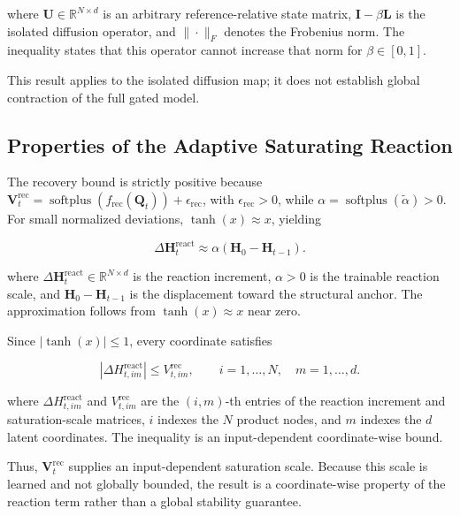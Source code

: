 \documentclass[letterpaper]{article} %
\begin{document}
where \(\mathbf U\in\mathbb R^{N\times d}\) is an arbitrary reference-relative state matrix, \(\mathbf I-\beta\mathbf L\) is the isolated diffusion operator, and \(\|\cdot\|_F\) denotes the Frobenius norm. The inequality states that this operator cannot increase that norm for \(\beta\in[0,1]\).

This result applies to the isolated diffusion map; it does not establish global contraction of the full gated model.

\subsection{Properties of the Adaptive Saturating Reaction}
\label{app:reaction-properties}

The recovery bound is strictly positive because \(\mathbf V_t^{\mathrm{rec}}=\operatorname{softplus}(f_{\mathrm{rec}}(\mathbf Q_t))+\epsilon_{\mathrm{rec}}\), with \(\epsilon_{\mathrm{rec}}>0\), while \(\alpha=\operatorname{softplus}(\widetilde\alpha)>0\). For small normalized deviations, \(\tanh(x)\approx x\), yielding

\begin{equation}
\Delta\mathbf H_t^{\mathrm{react}}
\approx
\alpha(\mathbf H_0-\mathbf H_{t-1}).
\label{eq:app-linearized-reaction}
\end{equation}

where \(\Delta\mathbf H_t^{\mathrm{react}}\in\mathbb R^{N\times d}\) is the reaction increment, \(\alpha>0\) is the trainable reaction scale, and \(\mathbf H_0-\mathbf H_{t-1}\) is the displacement toward the structural anchor. The approximation follows from \(\tanh(x)\approx x\) near zero.

Since \(|\tanh(x)|\leq1\), every coordinate satisfies

\begin{equation}
\left|
\Delta H_{t,im}^{\mathrm{react}}
\right|
\leq V_{t,im}^{\mathrm{rec}},
\qquad i=1,\ldots,N,\quad m=1,\ldots,d.
\label{eq:app-reaction-bound}
\end{equation}

where \(\Delta H_{t,im}^{\mathrm{react}}\) and \(V_{t,im}^{\mathrm{rec}}\) are the \((i,m)\)-th entries of the reaction increment and saturation-scale matrices, \(i\) indexes the \(N\) product nodes, and \(m\) indexes the \(d\) latent coordinates. The inequality is an input-dependent coordinate-wise bound.

Thus, \(\mathbf V_t^{\mathrm{rec}}\) supplies an input-dependent saturation scale. Because this scale is learned and not globally bounded, the result is a coordinate-wise property of the reaction term rather than a global stability guarantee.
\end{document}
